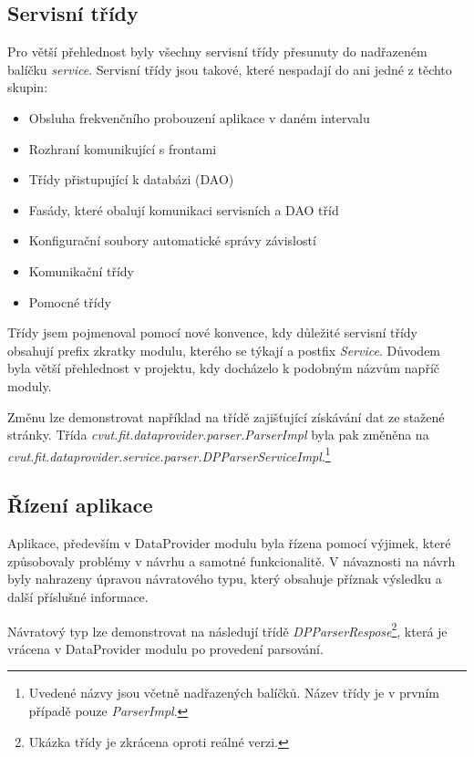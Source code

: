 \documentclass[thesis=B,czech]{FITthesis}[2012/06/26]
\begin{document}
\subsection{Servisní třídy}
Pro větší přehlednost byly všechny servisní třídy přesunuty do nadřazeném balíčku \textit{service}. 
Servisní třídy jsou takové, které nespadají do ani jedné z těchto skupin:

\begin{itemize}
\item Obsluha frekvenčního probouzení aplikace v daném intervalu
\item Rozhraní komunikující s frontami
\item Třídy přistupující k databázi (DAO)
\item Fasády, které obalují komunikaci servisních a DAO tříd
\item Konfigurační soubory automatické správy závislostí
\item Komunikační třídy
\item Pomocné třídy
\end{itemize}

Třídy jsem pojmenoval pomocí nové konvence, kdy důležité servisní třídy obsahují prefix zkratky modulu, kterého se týkají
a postfix \textit{Service}. Důvodem byla větší přehlednost v projektu, kdy docházelo k podobným názvům napříč moduly.
\par
Změnu lze demonstrovat například na třídě zajišťující získávání dat ze stažené stránky. Třída \textit{cvut.fit.dataprovider.parser.ParserImpl} byla pak změněna na \textit{cvut.fit.dataprovider.service.parser.DPParserServiceImpl}.\footnote{Uvedené názvy jsou včetně 
nadřazených balíčků. Název třídy je v prvním případě pouze \textit{ParserImpl}.}

\subsection{Řízení aplikace}
Aplikace, především v DataProvider modulu byla řízena pomocí výjimek, které způsobovaly problémy v návrhu a samotné funkcionalitě.
V návaznosti na návrh byly nahrazeny úpravou návratového typu, který obsahuje příznak výsledku 
a další příslušné informace.
\par
Návratový typ lze demonstrovat na následují třídě \textit{DPParserRespose}\footnote{Ukázka třídy je zkrácena oproti reálné verzi.}, která je vrácena v DataProvider modulu po provedení parsování.
\end{document}

